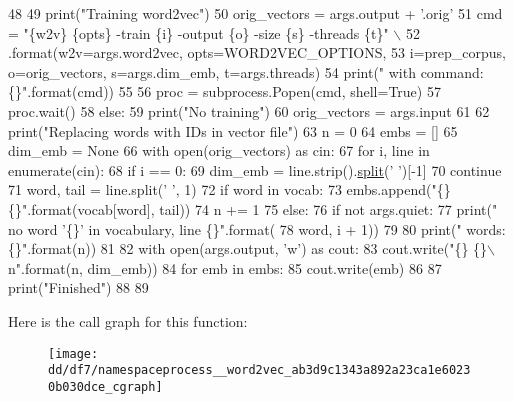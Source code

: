 \begin{DoxyCode}
48 
49         print(\textcolor{stringliteral}{"Training word2vec"})
50         orig\_vectors = args.output + \textcolor{stringliteral}{'.orig'}
51         cmd = \textcolor{stringliteral}{"\{w2v\} \{opts\} -train \{i\} -output \{o\} -size \{s\} -threads \{t\}"} \(\backslash\)
52             .format(w2v=args.word2vec, opts=WORD2VEC\_OPTIONS,
53                     i=prep\_corpus, o=orig\_vectors, s=args.dim\_emb, t=args.threads)
54         print(\textcolor{stringliteral}{"  with command: \{\}"}.format(cmd))
55 
56         proc = subprocess.Popen(cmd, shell=\textcolor{keyword}{True})
57         proc.wait()
58     \textcolor{keywordflow}{else}:
59         print(\textcolor{stringliteral}{"No training"})
60         orig\_vectors = args.input
61 
62     print(\textcolor{stringliteral}{"Replacing words with IDs in vector file"})
63     n = 0
64     embs = []
65     dim\_emb = \textcolor{keywordtype}{None}
66     with open(orig\_vectors) \textcolor{keyword}{as} cin:
67         \textcolor{keywordflow}{for} i, line \textcolor{keywordflow}{in} enumerate(cin):
68             \textcolor{keywordflow}{if} i == 0:
69                 dim\_emb = line.strip().\hyperlink{align2steps_8cpp_acc994bdb70df3b28bc0f94aede3731c3}{split}(\textcolor{stringliteral}{' '})[-1]
70                 \textcolor{keywordflow}{continue}
71             word, tail = line.split(\textcolor{stringliteral}{' '}, 1)
72             \textcolor{keywordflow}{if} word \textcolor{keywordflow}{in} vocab:
73                 embs.append(\textcolor{stringliteral}{"\{\} \{\}"}.format(vocab[word], tail))
74                 n += 1
75             \textcolor{keywordflow}{else}:
76                 \textcolor{keywordflow}{if} \textcolor{keywordflow}{not} args.quiet:
77                     print(\textcolor{stringliteral}{"  no word '\{\}' in vocabulary, line \{\}"}.format(
78                         word, i + 1))
79 
80     print(\textcolor{stringliteral}{"  words: \{\}"}.format(n))
81 
82     with open(args.output, \textcolor{stringliteral}{'w'}) \textcolor{keyword}{as} cout:
83         cout.write(\textcolor{stringliteral}{"\{\} \{\}\(\backslash\)n"}.format(n, dim\_emb))
84         \textcolor{keywordflow}{for} emb \textcolor{keywordflow}{in} embs:
85             cout.write(emb)
86 
87     print(\textcolor{stringliteral}{"Finished"})
88 
89 
\end{DoxyCode}


Here is the call graph for this function\+:
\nopagebreak
\begin{figure}[H]
\begin{center}
\leavevmode
\texttt{[image: dd/df7/namespaceprocess\_\_word2vec\_ab3d9c1343a892a23ca1e60230b030dce\_cgraph]}
\end{center}
\end{figure}




